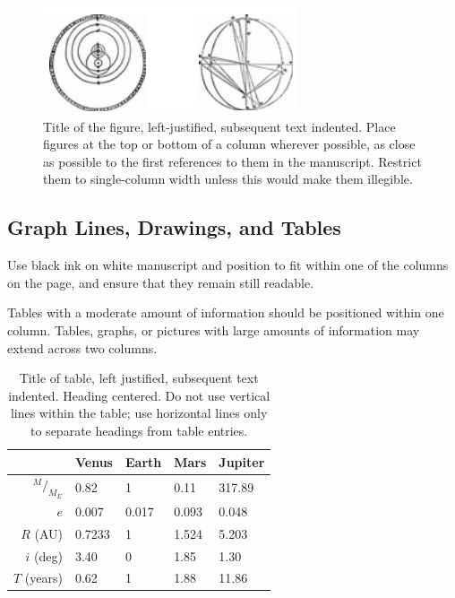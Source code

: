 \documentclass[]{iac}
\newcommand*\rfrac[2]{{{}^{#1}\!/_{#2}}} %
\begin{document}
\begin{figure}
\includegraphics[width=\columnwidth]{Figures/examplefigure.png}
\caption{\label{fig:X}Title of the figure, left-justified, subsequent text indented. Place figures at the top or bottom of a column wherever possible, as close as possible to the first references to them in the manuscript. Restrict them to single-column width unless this would make them illegible.} 
\end{figure}

\subsection{Graph Lines, Drawings, and Tables}
Use black ink on white manuscript and position to fit within one of the columns on the page, and ensure that they remain still readable.

Tables with a moderate amount of information should be positioned within one column. Tables, graphs, or pictures with large amounts of information may extend across two columns.

\begin{table}
\begin{tabular}{rllll}
\toprule
& Venus & Earth & Mars & Jupiter \\
\midrule
$\rfrac{M}{M_E}$	& 0.82 		& 1 		& 0.11 		& 317.89	\\
$e$					& 0.007		& 0.017		& 0.093		& 0.048		\\
$R$ (AU)			& 0.7233	& 1			& 1.524		& 5.203		\\
$i$ (deg)			& 3.40		& 0			& 1.85		& 1.30		\\
$T$ (years)			& 0.62		& 1			& 1.88		& 11.86		\\
\bottomrule
\end{tabular}
\caption{\label{table:X}Title of table, left justified, subsequent text indented. Heading centered. Do not use vertical lines within the table; use horizontal lines only to separate headings from table entries.}
\end{table}
\end{document}
